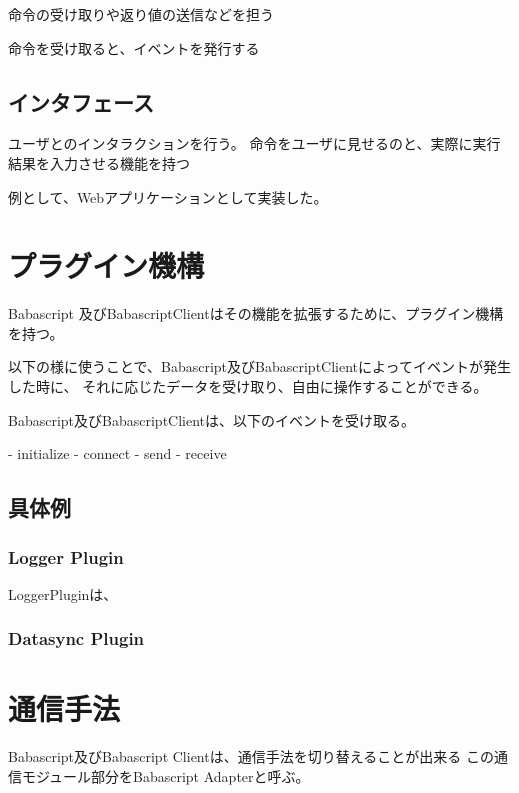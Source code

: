 命令の受け取りや返り値の送信などを担う

命令を受け取ると、イベントを発行する



\subsection{インタフェース}

ユーザとのインタラクションを行う。
命令をユーザに見せるのと、実際に実行結果を入力させる機能を持つ

例として、Webアプリケーションとして実装した。


\section{プラグイン機構}

Babascript 及びBabascriptClientはその機能を拡張するために、プラグイン機構を持つ。

以下の様に使うことで、Babascript及びBabascriptClientによってイベントが発生した時に、
それに応じたデータを受け取り、自由に操作することができる。

Babascript及びBabascriptClientは、以下のイベントを受け取る。

- initialize
- connect
- send
- receive

\subsection{具体例}



\subsubsection{Logger Plugin}

LoggerPluginは、

\subsubsection{Datasync Plugin}


\section{通信手法}

Babascript及びBabascript Clientは、通信手法を切り替えることが出来る
この通信モジュール部分をBabascript Adapterと呼ぶ。

